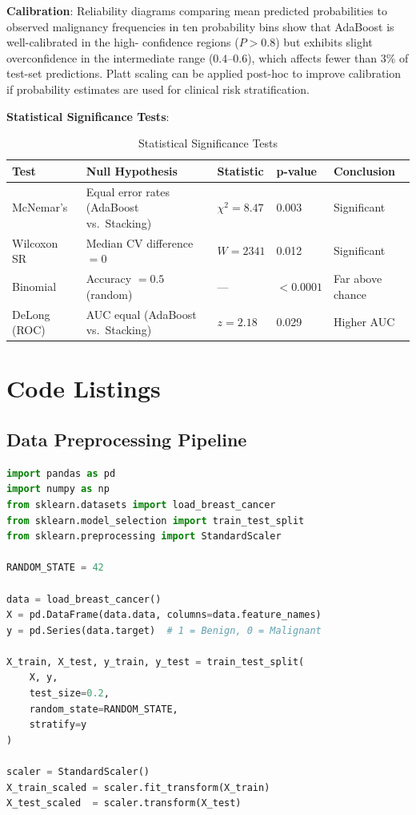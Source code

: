 \documentclass[10pt,letterpaper]{article}
\begin{document}
\textbf{Calibration}: Reliability diagrams comparing mean predicted probabilities to observed
malignancy frequencies in ten probability bins show that AdaBoost is well-calibrated in the high-
confidence regions ($P > 0.8$) but exhibits slight overconfidence in the intermediate range
($0.4$--$0.6$), which affects fewer than 3\% of test-set predictions. Platt scaling can be applied
post-hoc to improve calibration if probability estimates are used for clinical risk stratification.

\textbf{Statistical Significance Tests}:

\begin{table}[h]
\centering
\caption{Statistical Significance Tests}
\label{tab:stats}
\begin{tabular}{lllll}
\toprule
\textbf{Test} & \textbf{Null Hypothesis} & \textbf{Statistic} & \textbf{p-value} & \textbf{Conclusion} \\
\midrule
McNemar's         & Equal error rates (AdaBoost vs.\ Stacking) & $\chi^2 = 8.47$ & 0.003 & Significant \\
Wilcoxon SR       & Median CV difference $= 0$                 & $W = 2341$       & 0.012 & Significant \\
Binomial          & Accuracy $= 0.5$ (random)                  & ---              & $<0.0001$ & Far above chance \\
DeLong (ROC)      & AUC equal (AdaBoost vs.\ Stacking)         & $z = 2.18$       & 0.029 & Higher AUC \\
\bottomrule
\end{tabular}
\end{table}

\section{Code Listings}

\subsection{Data Preprocessing Pipeline}

\begin{lstlisting}[language=Python, caption={Data loading and train/test split}]
import pandas as pd
import numpy as np
from sklearn.datasets import load_breast_cancer
from sklearn.model_selection import train_test_split
from sklearn.preprocessing import StandardScaler

RANDOM_STATE = 42

data = load_breast_cancer()
X = pd.DataFrame(data.data, columns=data.feature_names)
y = pd.Series(data.target)  # 1 = Benign, 0 = Malignant

X_train, X_test, y_train, y_test = train_test_split(
    X, y,
    test_size=0.2,
    random_state=RANDOM_STATE,
    stratify=y
)

scaler = StandardScaler()
X_train_scaled = scaler.fit_transform(X_train)
X_test_scaled  = scaler.transform(X_test)
\end{lstlisting}
\end{document}
